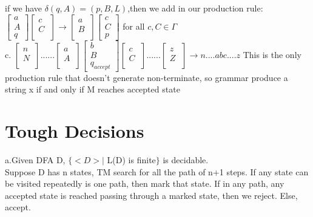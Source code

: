 \documentclass[12pt]{article}
\begin{document}
if we have $\delta(q,A) = (p,B,L)$,then we add in our production rule:\\
$
\begin{bmatrix}
a\\
A\\
q
\end{bmatrix}
\begin{bmatrix}
c\\
C\\
\quad
\end{bmatrix}
\rightarrow
\begin{bmatrix}
a\\
B\\
\quad
\end{bmatrix}
\begin{bmatrix}
c\\
C\\
p
\end{bmatrix}
$
for all $c,C \in \Gamma$\\

c.
$
\begin{bmatrix}
n\\
N\\
\quad
\end{bmatrix}......
\begin{bmatrix}
a\\
A\\
\quad
\end{bmatrix}
\begin{bmatrix}
b\\
B\\
q_{accept}
\end{bmatrix}
\begin{bmatrix}
c\\
C\\
\quad
\end{bmatrix}......
\begin{bmatrix}
z\\
Z\\
\quad
\end{bmatrix}
\rightarrow n....abc....z
$
This is the only production rule that doesn't generate non-terminate, so grammar produce a string x if and only if M reaches accepted state

\pagebreak
\section{Tough Decisions}
a.Given DFA D, $ \{<D> |$ L(D) is finite$\}$ is decidable.\\
Suppose D has n states, TM search for all the path of n+1 steps. If any state can be visited repeatedly is one path, then mark that state. If in any path, any accepted state is reached passing through a marked state, then we reject. Else, accept.\\
\end{document}
